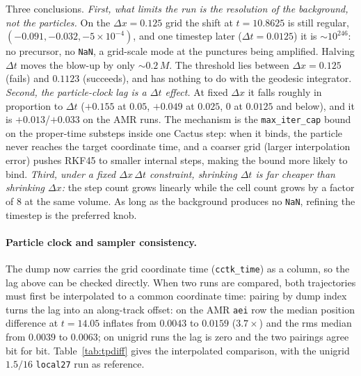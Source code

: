 \documentclass[11pt]{article}
\begin{document}
Three conclusions.  \emph{First, what limits the run is the resolution of the
background, not the particles.}  On the $\Delta x = 0.125$ grid the shift at
$t = 10.8625$ is still regular, $(-0.091, -0.032, -5\times10^{-4})$, and one
timestep later ($\Delta t = 0.0125$) it is $\sim10^{246}$: no precursor, no
\texttt{NaN}, a grid-scale mode at the punctures being amplified.  Halving
$\Delta t$ moves the blow-up by only $\sim0.2\,M$.  The threshold lies between
$\Delta x = 0.125$ (fails) and $0.1123$ (succeeds), and has nothing to do with
the geodesic integrator.  \emph{Second, the particle-clock lag is a
$\Delta t$ effect.}  At fixed $\Delta x$ it falls roughly in proportion to
$\Delta t$ ($+0.155$ at $0.05$, $+0.049$ at $0.025$, $0$ at $0.0125$ and below),
and it is $+0.013$/$+0.033$ on the AMR runs.  The mechanism is the
\texttt{max\_iter\_cap} bound on the proper-time substeps inside one Cactus
step: when it binds, the particle never reaches the target coordinate time, and a
coarser grid (larger interpolation error) pushes RKF45 to smaller internal steps,
making the bound more likely to bind.
\emph{Third, under a fixed $\Delta x\,\Delta t$ constraint, shrinking
$\Delta t$ is far cheaper than shrinking $\Delta x$:} the step count grows
linearly while the cell count grows by a factor of $8$ at the same volume.  As
long as the background produces no \texttt{NaN}, refining the timestep is the
preferred knob.

\paragraph{Particle clock and sampler consistency.}
The dump now carries the grid coordinate time (\texttt{cctk\_time}) as a column,
so the lag above can be checked directly.  When two runs are compared, both
trajectories must first be interpolated to a common coordinate time: pairing by
dump index turns the lag into an along-track offset: on the AMR \texttt{aei} row
the median position difference at $t = 14.05$ inflates from $0.0043$ to $0.0159$
($3.7\times$) and the rms median from $0.0039$ to $0.0063$; on unigrid runs the
lag is zero and the two pairings agree bit for bit.
Table~\ref{tab:tpdiff} gives the interpolated comparison, with the unigrid
$1.5/16$ \texttt{local27} run as reference.
\end{document}
